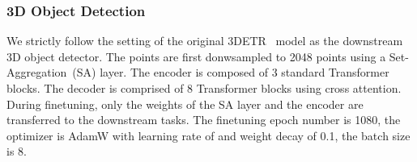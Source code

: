 \documentclass[runningheads]{llncs}
\begin{document}
\subsubsection{3D Object Detection}
We strictly follow the setting of the original 3DETR~\cite{misra2021-3detr} model as the downstream 3D object detector. The points are first donwsampled to 2048 points using a Set-Aggregation~(SA) layer. The encoder is composed of 3 standard Transformer blocks. The decoder is comprised of 8 Transformer blocks using cross attention. During finetuning, only the weights of the SA layer and the encoder are transferred to the downstream tasks.  The finetuning epoch number is 1080, the optimizer is AdamW with learning rate of  and weight decay of 0.1, the batch size is 8. 
 


\end{document}
